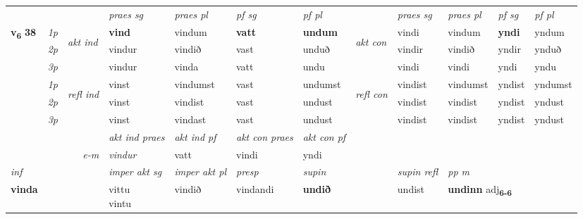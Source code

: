 \begin{longtable}[l]{X>{\footnotesize\itshape}llXXXXlXXXX}
 & &   & \textit{praes sg}  & \textit{praes pl}    & \textit{ pf sg} & \textit{pf pl} & & \textit{praes sg}  & \textit{praes pl}    & \textit{pf sg} & \textit{pf pl }  \\ \cmidrule{4-7} \cmidrule{9-12}
 \multirow{2}{*}{{{\textbf{v{\textsubscript{6}}} \Large{\textbf{38}}}}}  & 1p & \multirow{3}{*}{\begin{turn}{90}\textit{akt ind}\end{turn}} & \textbf{vind} & vindum & \textbf{vatt} & \textbf{undum} & \multirow{3}{*}{\begin{turn}{90}\textit{akt con}\end{turn}} &vindi & vindum & \textbf{yndi} & yndum\\*
 & 2p &  &  vindur  & vindið & vast & unduð & & vindir & vindið & yndir & ynduð \\*
 & 3p &  & vindur & vinda & vatt & undu & & vindi & vindi& yndi & yndu \\*
\cmidrule{4-7} \cmidrule{9-12}
 & 1p & \multirow{3}{*}{\begin{turn}{90}\textit{refl ind}\end{turn}}  & vinst & vindumst & vast & undumst & \multirow{3}{*}{\begin{turn}{90}\textit{refl con}\end{turn}}  &vindist & vindumst & yndist & yndumst \\*
 & 2p &  & vinst & vindist & vast & undust & &vindist & vindist & yndist & yndust \\*
 & 3p  & & vinst & vindast & vast & undust & & vindist & vindist& yndist & yndust \\*
\cmidrule{4-7} \cmidrule{9-12}

   && &  \textit{akt ind praes} & \textit{akt ind pf} & \textit{akt con praes} & \textit{akt con pf} \\*
\multicolumn{3}{r}{\textit{e-m}} & vindur & vatt & vindi & yndi \\*

\cmidrule{4-7}
   {\textit{inf}} & &  & \textit{imper akt sg} & \textit{imper akt pl}   & \textit{presp} & \textit{supin} && \textit{supin refl} & \textit{pp m} \\*
  {\textbf{vinda}} & && \specialcell{vittu\\ vintu}  & vindið   & vindandi &  \textbf{undið} && undist & \multicolumn{2}{l}{\textbf{undinn} adj\textbf{\textsubscript{6-6}}} \\*

\midrule


\end{longtable}
